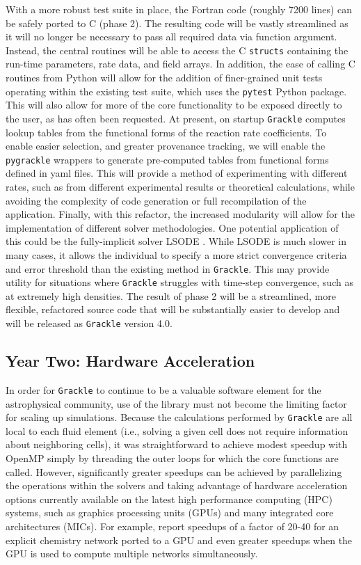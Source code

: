 \documentclass[11pt]{article}
\newcommand{\grackle}{\texttt{Grackle}}
\begin{document}
\begin{flushleft}
With a more robust test suite in place, the Fortran code (roughly 7200
lines) can be safely ported to C (phase 2).  The resulting code will
be vastly streamlined as it will no longer be necessary to pass all
required data via function argument.  Instead, the central routines
will be able to access the C \texttt{structs} containing the run-time
parameters, rate data, and field arrays.  In addition, the ease of
calling C routines from Python will allow for the addition of
finer-grained unit tests operating within the existing test suite,
which uses the \texttt{pytest} Python package.  This will also allow
for more of the core functionality to be exposed directly to the user,
as has often been requested.
At present, on startup \grackle{} computes lookup tables from the
functional forms of the reaction rate coefficients.  To enable easier
selection, and greater provenance tracking, we will enable the
\texttt{pygrackle} wrappers to generate pre-computed tables from
functional forms defined in yaml files.  This will provide a method of
experimenting with different rates, such as from different
experimental results or theoretical calculations, while avoiding the
complexity of code generation or full recompilation of the
application.  Finally, with this refactor, the
increased modularity will allow for the implementation of different
solver methodologies.  One potential application of this could be the
fully-implicit solver LSODE \citep{LSODE}.  While LSODE is much slower in many
cases, it allows the individual to specify a more strict convergence
criteria and error threshold than the existing method in \grackle{}.
This may provide utility for situations where \grackle{} struggles
with time-step convergence, such as at extremely high densities.
The result of phase 2 will be a streamlined, more flexible,
refactored source code that will be substantially easier to develop
and will be released as \grackle{} version 4.0.

\subsection{Year Two: Hardware Acceleration}

In order for \grackle{} to continue to be a valuable software element
for the astrophysical community, use of the library must not become
the limiting factor for scaling up simulations.  Because the
calculations performed by \grackle{} are all local to each fluid
element (i.e., solving a given cell does not require information about
neighboring cells), it was straightforward to achieve modest speedup
with OpenMP simply by threading the outer loops for which the core
functions are called.  However, significantly greater speedups can be
achieved by parallelizing the operations within the solvers and taking
advantage of hardware acceleration options currently available on the
latest high performance computing (HPC) systems, such as graphics
processing units (GPUs) and many integrated core architectures (MICs).
For example, \citet{Haidar2016PerformanceAA} report speedups of a
factor of 20-40
for an explicit chemistry network ported to a GPU and even greater
speedups when the GPU is used to compute multiple networks
simultaneously.


\end{flushleft}
\end{document}
